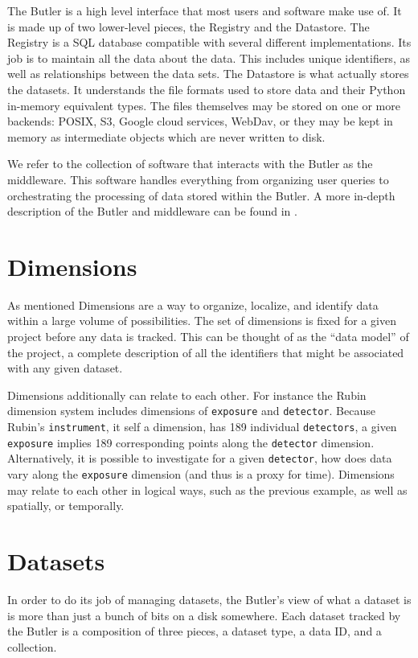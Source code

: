 \documentclass[11pt,twoside]{article}
\begin{document}
The Butler is a high level interface that most users and software make use of. It is made up of two lower-level pieces, the Registry and the Datastore. The Registry is a SQL database compatible with several different implementations. Its job is to maintain all the data about the data. This includes unique identifiers, as well as relationships between the data sets. The Datastore is what actually stores the datasets. It understands the file formats used to store data and their Python in-memory equivalent types. The files themselves may be stored on one or more backends: POSIX, S3, Google cloud services, WebDav, or they may be kept in memory as intermediate objects which are never written to disk.

We refer to the collection of software that interacts with the Butler as the middleware. This software handles everything from organizing user queries to orchestrating the processing of data stored within the Butler. A more in-depth description of the Butler and middleware can be found in \citet{2022SPIE12189E..11J}.

\section{Dimensions}
As mentioned Dimensions are a way to organize, localize, and identify data within a large volume of possibilities. The set of dimensions is fixed for a given project before any data is tracked. This can be thought of as the ``data model'' of the project, a complete description of all the identifiers that might be associated with any given dataset.

Dimensions additionally can relate to each other. For instance the Rubin dimension system includes dimensions of \texttt{exposure} and \texttt{detector}. Because Rubin's \texttt{instrument}, it self a dimension,  has 189 individual \texttt{detectors}, a given \texttt{exposure} implies 189 corresponding points along the \texttt{detector} dimension. Alternatively, it is possible to investigate for a given \texttt{detector}, how does data vary along the \texttt{exposure} dimension (and thus is a proxy for time). Dimensions may relate to each other in logical ways, such as the previous example, as well as spatially, or temporally.

\section{Datasets}
In order to do its job of managing datasets, the Butler's view of what a dataset is is more than just a bunch of bits on a disk somewhere. Each dataset tracked by the Butler is a composition of three pieces, a dataset type, a data ID, and a collection.
\end{document}
